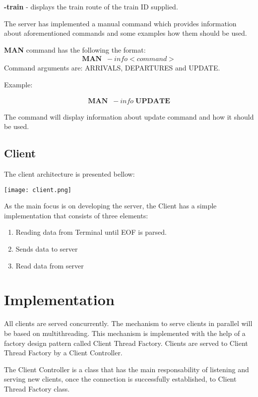 \documentclass[runningheads]{llncs}
\begin{document}
\textbf{-train} - displays the train route of the train ID supplied.

The server has implemented a manual command which provides information about aforementioned commands and some examples how them should be used.

\textbf{MAN} command has the following the format:  
\begin{gather*}
    \textbf{MAN} \;\;-info <command>
\end{gather*}
Command arguments are: ARRIVALS, DEPARTURES and UPDATE.

Example:

\begin{gather*}
    \textbf{MAN} \;\;-info \; \textbf{UPDATE}
\end{gather*}

The command will display information about update command and how it should be used.

\subsection{Client}
The client architecture is presented bellow:

\vspace{5mm}
\texttt{[image: client.png]}
\vspace{5mm}

As the main focus is on developing the server, the Client has a simple implementation that consists of three elements:
\begin{enumerate}
    \item Reading data from Terminal until EOF is parsed.
    \item Sends data to server
    \item Read data from server
\end{enumerate}

\section{Implementation}

All clients are served concurrently. The mechanism to serve clients in parallel will be based on multithreading.
This mechanism is implemented with the help of a factory design pattern called Client Thread Factory. Clients are served to Client Thread Factory by a Client Controller.

The Client Controller is a class that has the main responsability of listening and serving new clients, once the connection is successfully established, to Client Thread Factory class.
\end{document}
